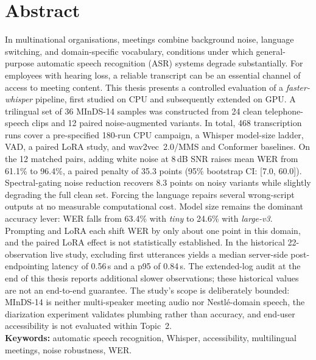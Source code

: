 \documentclass[12pt]{report}
\begin{document}
\section*{Abstract}
{}
In multinational organisations, meetings combine background noise, language switching, and domain-specific vocabulary, conditions under which general-purpose automatic speech recognition (ASR) systems degrade substantially. For employees with hearing loss, a reliable transcript can be an essential channel of access to meeting content. This thesis presents a controlled evaluation of a \textit{faster-whisper} pipeline, first studied on CPU and subsequently extended on GPU. A trilingual set of 36 MInDS-14 samples was constructed from 24 clean telephone-speech clips and 12 paired noise-augmented variants. In total, 468 transcription runs cover a pre-specified 180-run CPU campaign, a Whisper model-size ladder, VAD, a paired LoRA study, and wav2vec~2.0/MMS and Conformer baselines. On the 12 matched pairs, adding white noise at 8\,dB SNR raises mean WER from 61.1\% to 96.4\%, a paired penalty of 35.3 points (95\% bootstrap CI: [7.0, 60.0]). Spectral-gating noise reduction recovers 8.3 points on noisy variants while slightly degrading the full clean set. Forcing the language repairs several wrong-script outputs at no measurable computational cost. Model size remains the dominant accuracy lever: WER falls from 63.4\% with \textit{tiny} to 24.6\% with \textit{large-v3}. Prompting and LoRA each shift WER by only about one point in this domain, and the paired LoRA effect is not statistically established. In the historical 22-observation live study, excluding first utterances yields a median server-side post-endpointing latency of 0.56\,s and a p95 of 0.84\,s. The extended-log audit at the end of this thesis reports additional slower observations; these historical values are not an end-to-end guarantee. The study's scope is deliberately bounded: MInDS-14 is neither multi-speaker meeting audio nor Nestlé-domain speech, the diarization experiment validates plumbing rather than accuracy, and end-user accessibility is not evaluated within Topic~2.
\\
\textbf{Keywords:} automatic speech recognition, Whisper, accessibility, multilingual meetings, noise robustness, WER.
\thispagestyle{fancy}
\setcounter{page}{6}
\newpage
{}
{}
\setcounter{page}{7}
\thispagestyle{fancy}
\newpage
\listoffigures
\thispagestyle{fancy}
{}
\newpage
\listoftables
\thispagestyle{fancy}
{}
\newpage
{}
{}
\end{document}
